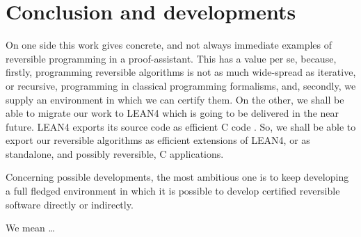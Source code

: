 \documentclass[runningheads]{llncs}
\newcommand{\CPP}{\textsf{C}\xspace}
\newcommand{\LEANFour}{\textsf{LEAN4}\xspace}
\begin{document}
\section{Conclusion and developments}
\label{section:Conclusion and developments}
On one side this work gives concrete, and not always immediate examples of reversible programming in a proof-assistant. This has a value per se, because, firstly, programming reversible algorithms is not as much wide-spread as iterative, or recursive, programming in classical programming formalisms, and, secondly, we supply an environment in which we can certify them.
On the other, we shall be able to migrate our work to \LEANFour which is going to be delivered in the near future. \LEANFour exports its source code as efficient \CPP code \cite{2021-LEAN4-MouraUllrich}. So, we shall be able to export our reversible algorithms as efficient extensions of \LEANFour, or as standalone, and possibly reversible, \CPP applications.

Concerning possible developments, the most ambitious one is to keep developing a full fledged environment in which it is possible to develop certified reversible software directly or indirectly.

We mean \ldots




\end{document}
